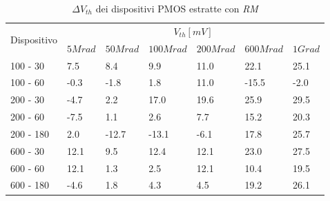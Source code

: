 \documentclass[12pt, letterpaper]{book}
\begin{document}
\begin{table}[H]
  \renewcommand{\arraystretch}{1.3}
  \begin{tabular}{m{2cm}  m{1.1cm} m{1.3cm} m{1.5cm} m{1.5cm} m{1.5cm} m{1cm}}
    \toprule
    \multirow{2}{*}{Dispositivo} & \multicolumn{6}{c}{$V_{th} [mV] $}                                                          \\
    \cmidrule{2-7}
                                 & $5Mrad$                            & $50Mrad$ & $100Mrad$ & $200Mrad$ & $600Mrad$ & $1Grad$ \\
    \midrule
    100 - 30                     & 7.5                                & 8.4      & 9.9       & 11.0      & 22.1      & 25.1    \\
    \hline
    100 - 60                     & -0.3                               & -1.8     & 1.8       & 11.0      & -15.5     & -2.0    \\
    \hline
    200 - 30                     & -4.7                               & 2.2      & 17.0      & 19.6      & 25.9      & 29.5    \\
    \hline
    200 - 60                     & -7.5                               & 1.1      & 2.6       & 7.7       & 15.2      & 20.3    \\
    \hline
    200 - 180                    & 2.0                                & -12.7    & -13.1     & -6.1      & 17.8      & 25.7    \\
    \hline
    600 - 30                     & 12.1                               & 9.5      & 12.4      & 12.1      & 23.0      & 27.5    \\
    \hline
    600 - 60                     & 12.1                               & 1.3      & 2.5       & 12.1      & 10.4      & 19.5    \\
    \hline
    600 - 180                    & -4.6                               & 1.8      & 4.3       & 4.5       & 19.2      & 26.1    \\
    \bottomrule
  \end{tabular}
  \caption{$\Delta V_{th}$ dei dispositivi PMOS estratte con \emph{RM}}
  \label{tab:deltaVthRMP}
\end{table}
\end{document}
